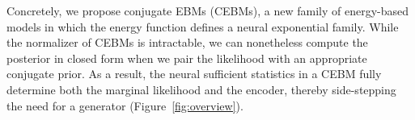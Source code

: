 \documentclass{article}
\begin{document}

Concretely, we propose conjugate EBMs (CEBMs), a new family of energy-based models in which the energy function defines a neural exponential family. While the normalizer of CEBMs is intractable, we can nonetheless compute the posterior in closed form when we pair the likelihood with an appropriate conjugate prior. As a result, the neural sufficient statistics in a CEBM fully determine both the marginal likelihood and the encoder, thereby side-stepping the need for a generator (Figure~\ref{fig:overview}).


\end{document}

